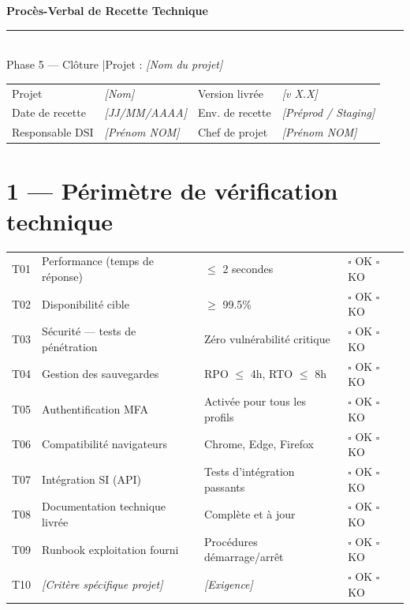 \documentclass[11pt,a4paper,oneside]{report}
\begin{document}
\small

\begin{center}
{\LARGE\bfseries\color{cnNavy} Procès-Verbal de Recette Technique}\\[4pt]
\textcolor{cnOrange}{\rule{10cm}{1pt}}\\[4pt]
{\large\color{cnSlate} Phase 5 — Clôture \quad|\quad Projet : \textit{[Nom du projet]}}
\end{center}

\vspace{4pt}
\renewcommand{\arraystretch}{1.4}
\begin{tabularx}{\textwidth}{L{3.5cm} Y L{3.5cm} Y}
\toprule
{} &  &  &  \\
\midrule
Projet             & \textit{[Nom]}         & Version livrée  & \textit{[v X.X]} \\
Date de recette    & \textit{[JJ/MM/AAAA]}  & Env. de recette & \textit{[Préprod / Staging]} \\
Responsable DSI    & \textit{[Prénom NOM]}  & Chef de projet  & \textit{[Prénom NOM]} \\
\bottomrule
\end{tabularx}

\section*{1 — Périmètre de vérification technique}

\renewcommand{\arraystretch}{1.3}
\begin{tabularx}{\textwidth}{C{1cm} L{5cm} Y C{3cm}}
\toprule
{}\th{\#} &  &  &  \\
\midrule
T01 & Performance (temps de réponse) & $\leq$ 2 secondes & $\square$ OK \quad $\square$ KO \\
T02 & Disponibilité cible & $\geq$ 99.5\% & $\square$ OK \quad $\square$ KO \\
T03 & Sécurité — tests de pénétration & Zéro vulnérabilité critique & $\square$ OK \quad $\square$ KO \\
T04 & Gestion des sauvegardes & RPO $\leq$ 4h, RTO $\leq$ 8h & $\square$ OK \quad $\square$ KO \\
T05 & Authentification MFA & Activée pour tous les profils & $\square$ OK \quad $\square$ KO \\
T06 & Compatibilité navigateurs & Chrome, Edge, Firefox & $\square$ OK \quad $\square$ KO \\
T07 & Intégration SI (API) & Tests d'intégration passants & $\square$ OK \quad $\square$ KO \\
T08 & Documentation technique livrée & Complète et à jour & $\square$ OK \quad $\square$ KO \\
T09 & Runbook exploitation fourni & Procédures démarrage/arrêt & $\square$ OK \quad $\square$ KO \\
T10 & \textit{[Critère spécifique projet]} & \textit{[Exigence]} & $\square$ OK \quad $\square$ KO \\
\bottomrule
\end{tabularx}
\end{document}
